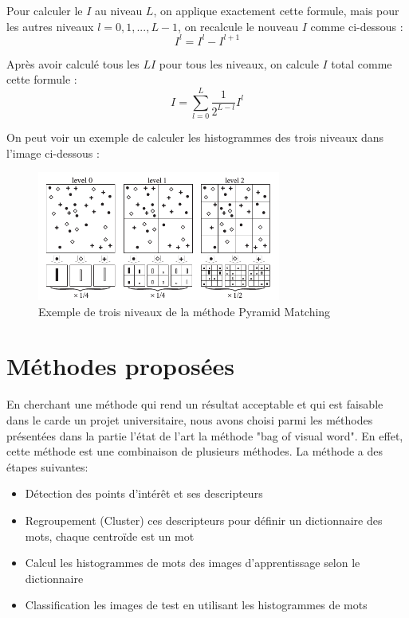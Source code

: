 \documentclass[french,12pt,a4paper,oneside,notitlepage]{report}
\begin{document}
Pour calculer le $I$ au niveau $L$, on applique exactement cette formule, mais pour les autres niveaux $l = 0, 1, ..., L-1$, on recalcule le nouveau $I$ comme ci-dessous : 
\begin{equation}
I^l = I^l - I^{l+1}
\end{equation}

Après avoir calculé tous les $L I$ pour tous les niveaux, on calcule $I$ total comme cette formule :
\begin{equation}
I = \sum_{l=0}^{L} \frac{1}{2^{L - l}} I^l
\end{equation}

On peut voir un exemple de calculer les histogrammes des trois niveaux dans l'image ci-dessous :
\begin{figure}[ht]
	\begin{center}
	  \includegraphics[width=8cm]{img3.png}
	\end{center}
	 \caption{Exemple de trois niveaux de la méthode Pyramid Matching}
\end{figure}

\pagebreak
\section{Méthodes proposées}
En cherchant une méthode qui rend un résultat acceptable et qui est faisable dans le 
carde un projet universitaire, nous avons choisi parmi les méthodes présentées dans la 
partie l'état de l'art la méthode "bag of visual word". En effet, cette méthode est une 
combinaison de plusieurs méthodes. La méthode a des étapes suivantes: 
\begin{itemize}
 \item Détection des points d'intérêt et ses descripteurs
 \item Regroupement (Cluster) ces descripteurs pour définir un dictionnaire des mots, 
chaque centroïde est un mot 
 \item Calcul les histogrammes de mots des images d'apprentissage selon le dictionnaire
 \item Classification les images de test en utilisant les histogrammes de mots
\end{itemize}
\end{document}
